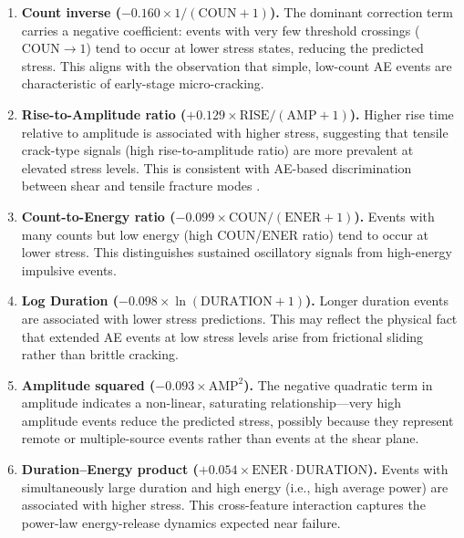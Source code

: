 \documentclass[12pt,a4paper]{article}
\begin{document}
\begin{enumerate}
  \item \textbf{Count inverse ($-0.160 \times 1/(\text{COUN}+1)$).}
        The dominant correction term carries a negative coefficient: events with
        very few threshold crossings ($\text{COUN} \to 1$) tend to occur at
        lower stress states, reducing the predicted stress. This aligns with the
        observation that simple, low-count AE events are characteristic of
        early-stage micro-cracking.

  \item \textbf{Rise-to-Amplitude ratio ($+0.129 \times
        \text{RISE}/(\text{AMP}+1)$).}
        Higher rise time relative to amplitude is associated with higher stress,
        suggesting that tensile crack-type signals (high rise-to-amplitude ratio)
        are more prevalent at elevated stress levels. This is consistent with
        AE-based discrimination between shear and tensile fracture modes
        \citep{ohno2010}.

  \item \textbf{Count-to-Energy ratio ($-0.099 \times
        \text{COUN}/(\text{ENER}+1)$).}
        Events with many counts but low energy (high COUN/ENER ratio) tend to
        occur at lower stress. This distinguishes sustained oscillatory signals
        from high-energy impulsive events.

  \item \textbf{Log Duration ($-0.098 \times \ln(\text{DURATION}+1)$).}
        Longer duration events are associated with lower stress predictions. This
        may reflect the physical fact that extended AE events at low stress
        levels arise from frictional sliding rather than brittle cracking.

  \item \textbf{Amplitude squared ($-0.093 \times \text{AMP}^{2}$).}
        The negative quadratic term in amplitude indicates a non-linear,
        saturating relationship---very high amplitude events reduce the predicted
        stress, possibly because they represent remote or multiple-source events
        rather than events at the shear plane.

  \item \textbf{Duration--Energy product ($+0.054 \times
        \text{ENER} \cdot \text{DURATION}$).}
        Events with simultaneously large duration and high energy (i.e., high
        average power) are associated with higher stress. This cross-feature
        interaction captures the power-law energy-release dynamics expected near
        failure.
\end{enumerate}
\end{document}
